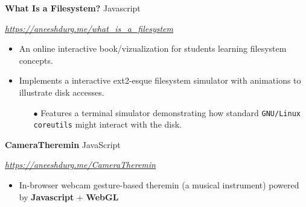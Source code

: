 \documentclass[paper=a4,fontsize=11pt]{scrartcl} %
\newcommand{\EducationEntry}[4]{
		\noindent \textbf{#1}     %
			\hfill#2 \par  %
		\noindent \textit{#3} \par        %
		\noindent\hangafter=0 \small #4 %
		\normalsize \par}
\begin{document}
\EducationEntry{What Is a Filesystem?}{Javascript}{\url{https://aneeshdurg.me/what_is_a_filesystem}}{
\begin{itemize}
\item An online interactive book/vizualization for students learning filesystem concepts.
\item Implements a interactive ext2-esque filesystem simulator with animations to illustrate disk accesses.
  \begin{itemize}
    \item[$\bullet$] Features a terminal simulator demonstrating how standard \texttt{GNU/Linux coreutils} might interact with the disk.
  \end{itemize}
\end{itemize}
}
\EducationEntry{CameraTheremin}{JavaScript}{\url{https://aneeshdurg.me/CameraTheremin}}{
\begin{itemize}
  \item In-browser webcam gesture-based theremin (a musical instrument) powered by \textbf{Javascript} + \textbf{WebGL}
\end{itemize}
}
\end{document}
